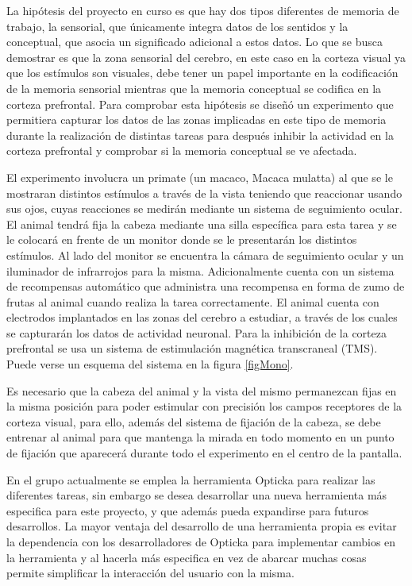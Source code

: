 \documentclass[conference]{IEEEtran}
\begin{document}
La hipótesis del proyecto en curso es que hay dos tipos diferentes de memoria de trabajo, la sensorial, que únicamente integra datos de los sentidos y la conceptual, que asocia un significado adicional a estos datos. Lo que se busca demostrar es que la zona sensorial del cerebro, en este caso en la corteza visual ya que los estímulos son visuales, debe tener un papel importante en la codificación de la memoria sensorial mientras que la memoria conceptual se codifica en la corteza prefrontal.
Para comprobar esta hipótesis se diseñó un experimento que permitiera capturar los datos de las zonas implicadas en este tipo de memoria durante la realización de distintas tareas para después inhibir la actividad en la corteza prefrontal y comprobar si la memoria conceptual se ve afectada.

El experimento involucra un primate (un macaco, Macaca mulatta) al que se le mostraran distintos estímulos a través de la vista teniendo que reaccionar usando sus ojos, cuyas reacciones se medirán mediante un sistema de seguimiento ocular. El animal tendrá fija la cabeza mediante una silla específica para esta tarea y se le colocará en frente de un monitor donde se le presentarán los distintos estímulos. Al lado del monitor se encuentra la cámara de seguimiento ocular y un iluminador de infrarrojos para la misma. Adicionalmente cuenta con un sistema de recompensas automático que administra una recompensa en forma de zumo de frutas al animal cuando realiza la tarea correctamente. El animal cuenta con electrodos implantados en las zonas del cerebro a estudiar, a través de los cuales se capturarán los datos de actividad neuronal. Para la inhibición de la corteza prefrontal se usa un sistema de estimulación magnética transcraneal (TMS). Puede verse un esquema del sistema en la figura \ref{figMono}.

Es necesario que la cabeza del animal y la vista del mismo permanezcan fijas en la misma posición para poder estimular con precisión los campos receptores de la corteza visual, para ello, además del sistema de fijación de la cabeza, se debe entrenar al animal para que mantenga la mirada en todo momento en un punto de fijación que aparecerá durante todo el experimento en el centro de la pantalla.


En el grupo actualmente se emplea la herramienta Opticka\cite{opticka} para realizar las diferentes tareas, sin embargo se desea desarrollar una nueva herramienta más especifica para este proyecto, y que además pueda expandirse para futuros desarrollos. La mayor ventaja del desarrollo de una herramienta propia es evitar la dependencia con los desarrolladores de Opticka para implementar cambios en la herramienta y al hacerla más especifica en vez de abarcar muchas cosas permite simplificar la interacción del usuario con la misma.
\end{document}
